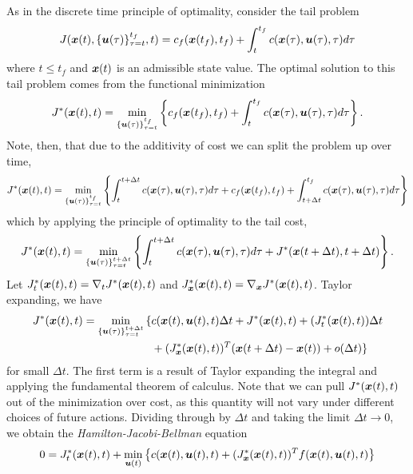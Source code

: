 As in the discrete time principle of optimality, consider the tail problem
\begin{equation}
    J(\bm{x}(t),\{\bm{u}(\tau)\}_{\tau=t}^{t_f},t) = c_f(\bm{x}(t_f),t_f) + \int_t^{t_f} c(\bm{x}(\tau),\bm{u}(\tau),\tau) d\tau
\end{equation}
where $t\leq t_f$ and $\bm{x}(t)$ is an admissible state value. The optimal solution to this tail problem comes from the functional minimization
\begin{equation}
    J^*(\bm{x}(t),t) = \min_{\{\bm{u}(\tau)\}_{\tau=t}^{t_f}} \left\{ c_f(\bm{x}(t_f),t_f) + \int_t^{t_f} c(\bm{x}(\tau),\bm{u}(\tau),\tau) d\tau\right\}.
\end{equation}
Note, then, that due to the additivity of cost we can split the problem up over time,
\begin{equation}
    J^*(\bm{x}(t),t) = \min_{\{\bm{u}(\tau)\}_{\tau=t}^{t_f}} \left\{ \int_t^{t+\Delta t} c(\bm{x}(\tau),\bm{u}(\tau),\tau) d\tau + c_f(\bm{x}(t_f),t_f) + \int_{t+\Delta t}^{t_f} c(\bm{x}(\tau),\bm{u}(\tau),\tau) d\tau\right\}
\end{equation}    
which by applying the principle of optimality to the tail cost,
\begin{equation}
     J^*(\bm{x}(t),t) = \min_{\{\bm{u}(\tau)\}_{\tau=t}^{t + \Delta t}} \left\{ \int_t^{t+\Delta t} c(\bm{x}(\tau),\bm{u}(\tau),\tau) d\tau + J^*(\bm{x}(t + \Delta t), t + \Delta t)\right\}.
\end{equation}
Let $J^*_t(\bm{x}(t),t) = \nabla_t J^* (\bm{x}(t),t)$ and $J^*_{\bm{x}}(\bm{x}(t),t) = \nabla_{\bm{x}} J^* (\bm{x}(t),t)$. Taylor expanding, we have 
\begin{align}
\J^*(\st(t),t) = \min_{\{\ac(\tau)\}_{\tau=t}^{t + \Delta t}} \huge{\{} &\cost(\st(t),\ac(t),t) \Delta t + \J^*(\st(t),t) + (\J_t^*(\st(t),t)) \Delta t \\
&+ (\J_{\st}^*(\st(t),t))^T (\st(t+\Delta t) - \st(t))  + o(\Delta t) \huge{\}} \nonumber
\end{align}
for small $\Delta t$. The first term is a result of Taylor expanding the integral and applying the fundamental theorem of calculus. Note that we can pull $J^*(\bm{x}(t),t)$ out of the minimization over cost, as this quantity will not vary under different choices of future actions. Dividing through by $\Delta t$ and taking the limit $\Delta t \to 0$, we obtain the \textit{Hamilton-Jacobi-Bellman} equation
\begin{equation}
    0 = J^*_t(\bm{x}(t),t) + \min_{\bm{u}(t)} \left\{ c(\bm{x}(t),\bm{u}(t),t) + (J_{\bm{x}}^*(\bm{x}(t),t))^T f(\bm{x}(t),\bm{u}(t),t) \right\}
\end{equation}
